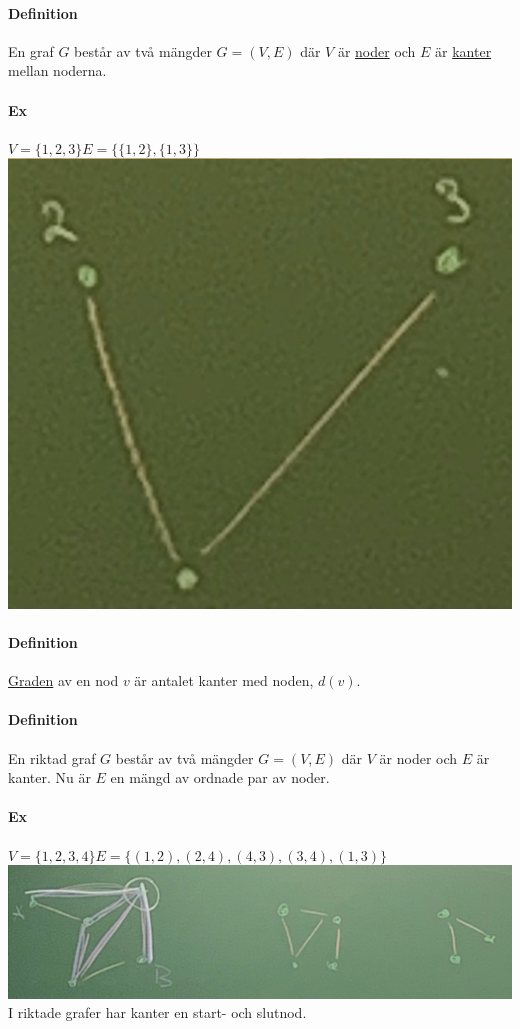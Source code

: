 \paragraph{Definition} En graf $G$ består av två mängder $G=(V,E)$ där $V$ är 
\underline{noder} och $E$ är \underline{kanter} mellan noderna.


\paragraph{Ex} $V=\{1,2,3\}$\indent$E=\{\{1,2\},\{1,3\}\}$\\
\includegraphics[scale=0.25]{imgs/img01.png}

\paragraph{Definition} \underline{Graden} av en nod $v$ är antalet kanter med noden, $d(v)$.

\paragraph{Definition} En riktad graf $G$ består av två mängder $G=(V,E)$ där $V$ är noder och $E$ är kanter.
Nu är $E$ en mängd av ordnade par av noder.

\paragraph{Ex} $V=\{1,2,3,4\}$\indent$E=\{(1,2),(2,4),(4,3),(3,4),(1,3)\}$\\
\includegraphics[scale=0.13]{imgs/img02.png}
I riktade grafer har kanter en start- och slutnod.

